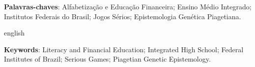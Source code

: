 \setlength{\absparsep}{18pt} %
\begin{resumo}
	
	
 	\noindent 
	\textbf{Palavras-chaves}: Alfabetização e Educação Financeira; Ensino Médio Integrado; Institutos Federais do Brasil; Jogos Sérios; Epistemologia Genética Piagetiana.
\end{resumo}

\begin{resumo}[Abstract]
\begin{otherlanguage*}{english}

    
 
	\noindent 
	\textbf{Keywords}: Literacy and Financial Education; Integrated High School; Federal Institutes of Brazil; Serious Games; Piagetian Genetic Epistemology.
\end{otherlanguage*}
\end{resumo}

 

  
